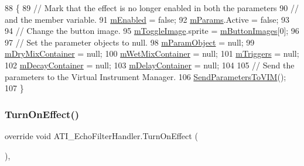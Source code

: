 \begin{DoxyCode}
88     \{
89         \textcolor{comment}{// Mark that the effect is no longer enabled in both the parameters}
90         \textcolor{comment}{// and the member variable.}
91         \hyperlink{class_a_t_i_1_1_audio_effect_handler_a378c463b827ad6e41d09a4ec2caff351}{mEnabled} = \textcolor{keyword}{false};
92         \hyperlink{class_a_t_i___echo_filter_handler_afe435170679cf364951083e6f6ffab36}{mParams}.Active = \textcolor{keyword}{false};
93 
94         \textcolor{comment}{// Change the button image.}
95         \hyperlink{class_a_t_i_1_1_audio_effect_handler_aa5bf03976a14594f089aac5681c15a83}{mToggleImage}.sprite = \hyperlink{class_a_t_i_1_1_audio_effect_handler_a6e1cfd5449b82870eacd7404a158c7a7}{mButtonImages}[0];
96 
97         \textcolor{comment}{// Set the parameter objects to null.}
98         \hyperlink{class_a_t_i_1_1_audio_effect_handler_a02ca13686cb3fc7bf152051ec881b0ed}{mParamObject} = null;
99         \hyperlink{class_a_t_i___echo_filter_handler_a631c4608453cd55ca976926e6e8e8ff2}{mDryMixContainer} = null;
100         \hyperlink{class_a_t_i___echo_filter_handler_a571d860b69c4ca4105355d0f1447feb2}{mWetMixContainer} = null;
101         \hyperlink{class_a_t_i_1_1_audio_effect_handler_a1db04dc85daf07d045117d9bc585e944}{mTriggers} = null;
102         \hyperlink{class_a_t_i___echo_filter_handler_a4e5a10c78852a38c5a6065efdf3f04f8}{mDecayContainer} = null;
103         \hyperlink{class_a_t_i___echo_filter_handler_a5f454ea9d1603937c5ddb4e3e1f7317d}{mDelayContainer} = null;
104 
105         \textcolor{comment}{// Send the parameters to the Virtual Instrument Manager.}
106         \hyperlink{class_a_t_i___echo_filter_handler_afacef95c6ac470707d2bd092031efac0}{SendParametersToVIM}();
107     \}
\end{DoxyCode}
\mbox{\label{class_a_t_i___echo_filter_handler_af759b786ad6e701f816264fefdddb078}} 
\subsubsection{\texorpdfstring{Turn\+On\+Effect()}{TurnOnEffect()}}
{\footnotesize\ttfamily override void A\+T\+I\+\_\+\+Echo\+Filter\+Handler.\+Turn\+On\+Effect (\begin{DoxyParamCaption}{ }\end{DoxyParamCaption})\hspace{0.3cm}{\ttfamily [protected]}, {\ttfamily [virtual]}}



